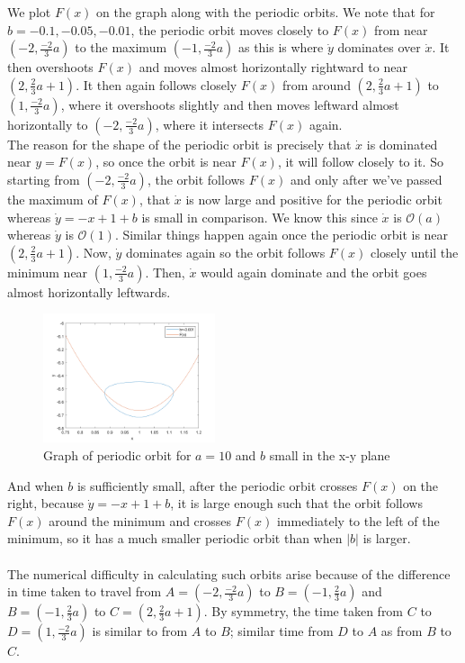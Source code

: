 \documentclass[10pt]{article}
\begin{document}
We plot $F(x)$ on the graph along with the periodic orbits. We note that for $b=-0.1,-0.05,-0.01$, the periodic orbit moves closely to $F(x)$ from near $(-2,\frac{-2}{3}a)$ to the maximum $(-1, \frac{-2}{3}a)$ as this is where $\dot{y}$ dominates over $\dot{x}$. It then overshoots $F(x)$ and moves almost horizontally rightward to near $(2,\frac{2}{3}a+1)$. It then again follows closely $F(x)$ from around $(2,\frac{2}{3}a+1)$ to $(1,\frac{-2}{3}a)$, where it overshoots slightly and then moves leftward almost horizontally to $(-2,\frac{-2}{3}a)$, where it intersects $F(x)$ again.\\
The reason for the shape of the periodic orbit is precisely that $\dot{x}$ is dominated near $y=F(x)$, so once the orbit is near $F(x)$, it will follow closely to it. So starting from $(-2,\frac{-2}{3}a)$, the orbit follows $F(x)$ and only after we've passed the maximum of $F(x)$, that $\dot{x}$ is now large and positive for the periodic orbit whereas $\dot{y}=-x+1+b$ is small in comparison. We know this since $\dot{x}$ is $\mathcal{O}(a)$ whereas $\dot{y}$ is $\mathcal{O}(1)$. Similar things happen again once the periodic orbit is near $(2,\frac{2}{3}a+1)$. Now, $\dot{y}$ dominates again so the orbit follows $F(x)$ closely until the minimum near $(1,\frac{-2}{3}a)$. Then, $\dot{x}$ would again dominate and the orbit goes almost horizontally leftwards.\\
\begin{figure}[H]
\centering
\includegraphics[width=0.45\textwidth]{Files/q10,a=10,2.png}
\caption{Graph of periodic orbit for $a=10$ and $b$ small in the x-y plane}
\end{figure}
\noindent And when $b$ is sufficiently small, after the periodic orbit crosses $F(x)$ on the right, because $\dot{y}=-x+1+b$, it is large enough such that the orbit follows $F(x)$ around the minimum and crosses $F(x)$ immediately to the left of the minimum, so it has a much smaller periodic orbit than when $|b|$ is larger.\\\\
The numerical difficulty in calculating such orbits arise because of the difference in time taken to travel from $A=(-2,\frac{-2}{3}a)$ to $B=(-1,\frac{2}{3}a)$ and $B=(-1,\frac{2}{3}a)$ to $C=(2,\frac{2}{3}a+1)$. By symmetry, the time taken from $C$ to $D=(1,\frac{-2}{3}a)$ is similar to from $A$ to $B$; similar time from $D$ to $A$ as from $B$ to $C$.\\
\end{document}
